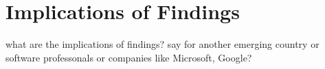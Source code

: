 \section{Implications of Findings}
\label{implications}



what are the implications of findings? say for another emerging country or software professonals or companies like Microsoft, Google?
